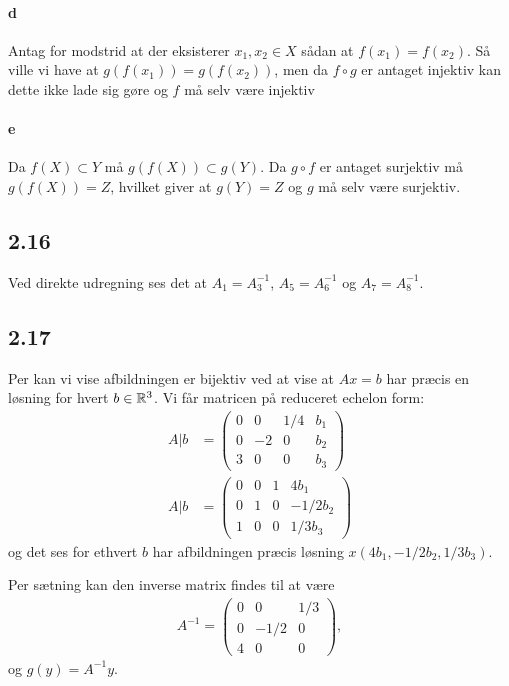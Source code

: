 			\paragraph{d} Antag for modstrid at der eksisterer $x_1,x_2 \in X$ sådan at $f(x_1)=f(x_2)$. Så ville vi have at $g(f(x_1))=g(f(x_2))$, men da $f \circ g$ er antaget injektiv kan dette ikke lade sig gøre og $f$ må selv være injektiv

			\paragraph{e} Da $f(X)\subset Y$ må $g(f(X)) \subset g(Y)$. Da $g \circ f$ er antaget surjektiv må $g(f(X))=Z$, hvilket giver at $g(Y)=Z$ og $g$ må selv være surjektiv.

		\subsection{2.16}

			Ved direkte udregning ses det at $A_1=A_3^{-1}$, $A_5=A_6^{-1}$ og $A_7=A_8^{-1}$. 

		\subsection{2.17} 

			Per \cite[sætning 2.4.9]{hesselholt2017} kan vi vise afbildningen er bijektiv ved at vise at $Ax=b$ har præcis en løsning for hvert $b\in \mathbb{R}^3$.  Vi får matricen på reduceret echelon form:
				\begin{align*}
					A|b&=\left(\begin{array}{ccc|c}{0} & {0} & {1 / 4} & {b_1} \\ {0} & {-2} & {0} & {b_2} \\ {3} & {0} & {0} & {b_3} \end{array}\right) \\
					A|b&=\left(\begin{array}{ccc|c}{0} & {0} & {1} & {4b_1} \\ {0} & {1} & {0} & {-1/2b_2} \\ {1} & {0} & {0} & {1/3b_3} \end{array}\right) 
				\end{align*} 
			og det ses for ethvert $b$ har afbildningen præcis løsning $x(4b_1,-1/2b_2,1/3b_3)$.

			Per sætning \cite[2.4.12]{hesselholt2017} kan den inverse matrix findes til at være 
				\begin{align*}
					A^{-1}=\left(\begin{array}{ccc}{0} & {0} & {1/3} \\ {0} & {-1/2} & {0} \\ {4} & {0} & {0} \end{array}\right),
				\end{align*} 
			og $g(y)=A^{-1}y$.

